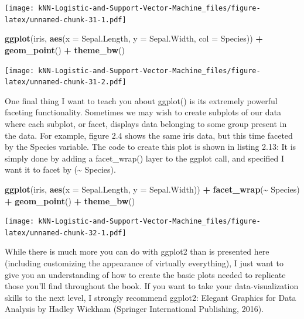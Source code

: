 \documentclass[
]{article}
\newenvironment{Shaded}{\begin{snugshade}}{\end{snugshade}}
\newcommand{\AttributeTok}[1]{\textcolor[rgb]{0.13,0.29,0.53}{#1}}
\newcommand{\FunctionTok}[1]{\textcolor[rgb]{0.13,0.29,0.53}{\textbf{#1}}}
\newcommand{\NormalTok}[1]{#1}
\newcommand{\SpecialCharTok}[1]{\textcolor[rgb]{0.81,0.36,0.00}{\textbf{#1}}}
\begin{document}
\texttt{[image: kNN-Logistic-and-Support-Vector-Machine\_files/figure-latex/unnamed-chunk-31-1.pdf]}

\begin{Shaded}
\begin{Highlighting}[]
\FunctionTok{ggplot}\NormalTok{(iris, }\FunctionTok{aes}\NormalTok{(}\AttributeTok{x =}\NormalTok{ Sepal.Length, }\AttributeTok{y =}\NormalTok{ Sepal.Width, }\AttributeTok{col =}\NormalTok{ Species)) }\SpecialCharTok{+}
  \FunctionTok{geom\_point}\NormalTok{() }\SpecialCharTok{+}
  \FunctionTok{theme\_bw}\NormalTok{()}
\end{Highlighting}
\end{Shaded}

\texttt{[image: kNN-Logistic-and-Support-Vector-Machine\_files/figure-latex/unnamed-chunk-31-2.pdf]}

One final thing I want to teach you about ggplot() is its extremely
powerful faceting functionality. Sometimes we may wish to create
subplots of our data where each subplot, or facet, displays data
belonging to some group present in the data. For example, figure 2.4
shows the same iris data, but this time faceted by the Species variable.
The code to create this plot is shown in listing 2.13: It is simply done
by adding a facet\_wrap() layer to the ggplot call, and specified I want
it to facet by (\textasciitilde{} Species).

\begin{Shaded}
\begin{Highlighting}[]
\FunctionTok{ggplot}\NormalTok{(iris, }\FunctionTok{aes}\NormalTok{(}\AttributeTok{x =}\NormalTok{ Sepal.Length, }\AttributeTok{y =}\NormalTok{ Sepal.Width)) }\SpecialCharTok{+} 
  \FunctionTok{facet\_wrap}\NormalTok{(}\SpecialCharTok{\textasciitilde{}}\NormalTok{ Species) }\SpecialCharTok{+}
  \FunctionTok{geom\_point}\NormalTok{() }\SpecialCharTok{+}
\FunctionTok{theme\_bw}\NormalTok{()}
\end{Highlighting}
\end{Shaded}

\texttt{[image: kNN-Logistic-and-Support-Vector-Machine\_files/figure-latex/unnamed-chunk-32-1.pdf]}

While there is much more you can do with ggplot2 than is presented here
(including customizing the appearance of virtually everything), I just
want to give you an understanding of how to create the basic plots
needed to replicate those you'll find throughout the book. If you want
to take your data-visualization skills to the next level, I strongly
recommend ggplot2: Elegant Graphics for Data Analysis by Hadley Wickham
(Springer International Publishing, 2016).
\end{document}
